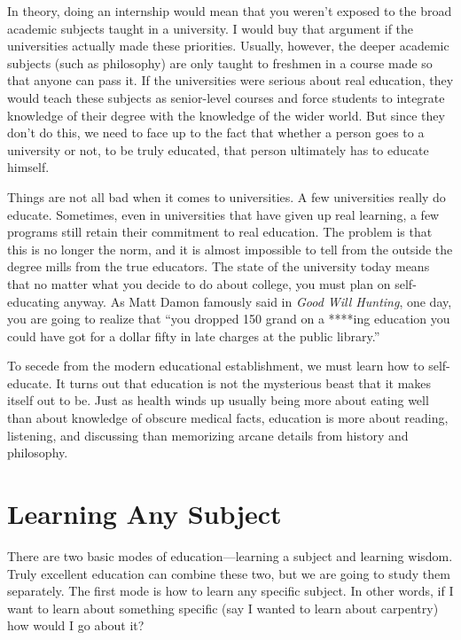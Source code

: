 In theory, doing an internship would mean that you weren’t exposed to
the broad academic subjects taught in a university. I would buy that
argument if the universities actually made these priorities. Usually,
however, the deeper academic subjects (such as philosophy) are only
taught to freshmen in a course made so that anyone can pass it. If the
universities were serious about real education, they would teach these
subjects as senior-level courses and force students to integrate
knowledge of their
degree with the knowledge of the wider world. But since they don't
do this, we need to face up to the fact that whether
a person goes to a university or not, to be truly educated,
that person ultimately has to educate himself.

Things are not all bad when it comes to universities. A few universities
really do educate.  Sometimes, even in universities that have given up
real learning, a few programs still retain their commitment to real education.
The problem is that this is no longer the norm, and it is
almost impossible to tell from the outside the degree mills from the
true educators. The state of the university today means that no matter
what you decide to do about college, you must plan on self-educating
anyway. As Matt Damon famously said in \textit{Good Will Hunting}, one
day, you are going to realize that ``you dropped 150 grand on a ****ing
education you could have got for a dollar fifty in late charges at the
public library.''

To secede from the modern educational establishment, we must learn how
to self-educate. It turns out that education is not the mysterious
beast that it makes itself out to be. Just as health winds up usually
being more about eating well than about knowledge of obscure medical
facts, education is more about reading, listening, and discussing than
memorizing arcane details from history and philosophy.

\section{Learning Any Subject}

There are two basic modes of education—learning a subject and learning
wisdom. Truly excellent education can combine these two, but we are
going to study them separately. The first mode is how to learn any
specific subject. In other words, if I want to learn about something
specific (say I
wanted to learn about
carpentry) how would
I go about it?  

